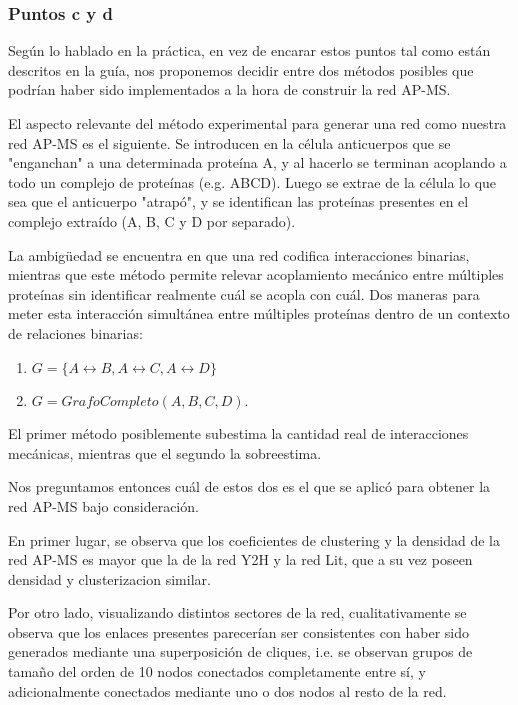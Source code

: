 \documentclass[11pt]{article}
\begin{document}
    \subsubsection{Puntos c y d}\label{puntos-c-y-d}

    Según lo hablado en la práctica, en vez de encarar estos puntos tal como
están descritos en la guía, nos proponemos decidir entre dos métodos
posibles que podrían haber sido implementados a la hora de construir la
red AP-MS.

    El aspecto relevante del método experimental para generar una red como
nuestra red AP-MS es el siguiente. Se introducen en la célula
anticuerpos que se "enganchan" a una determinada proteína A, y al
hacerlo se terminan acoplando a todo un complejo de proteínas (e.g.
ABCD). Luego se extrae de la célula lo que sea que el anticuerpo
"atrapó", y se identifican las proteínas presentes en el complejo
extraído (A, B, C y D por separado).

La ambigüedad se encuentra en que una red codifica interacciones
binarias, mientras que este método permite relevar acoplamiento mecánico
entre múltiples proteínas sin identificar realmente cuál se acopla con
cuál. Dos maneras para meter esta interacción simultánea entre múltiples
proteínas dentro de un contexto de relaciones binarias:

\begin{enumerate}
\def\labelenumi{\arabic{enumi})}
\item
  \(G=\{A\leftrightarrow B,A\leftrightarrow C,A\leftrightarrow D\}\)
\item
  \(G=GrafoCompleto(A,B,C,D)\).
\end{enumerate}

El primer método posiblemente subestima la cantidad real de
interacciones mecánicas, mientras que el segundo la sobreestima.

    Nos preguntamos entonces cuál de estos dos es el que se aplicó para
obtener la red AP-MS bajo consideración.

En primer lugar, se observa que los coeficientes de clustering y la
densidad de la red AP-MS es mayor que la de la red Y2H y la red Lit, que
a su vez poseen densidad y clusterizacion similar.

Por otro lado, visualizando distintos sectores de la red,
cualitativamente se observa que los enlaces presentes parecerían ser
consistentes con haber sido generados mediante una superposición de
cliques, i.e. se observan grupos de tamaño del orden de 10 nodos
conectados completamente entre sí, y adicionalmente conectados mediante
uno o dos nodos al resto de la red.
\end{document}
